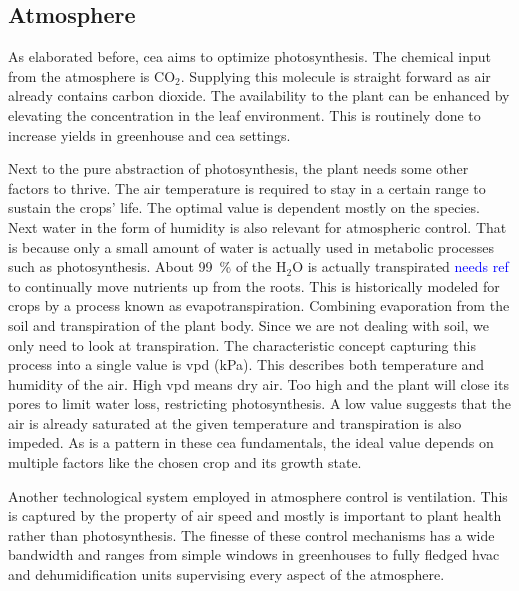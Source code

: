 \subsection{Atmosphere}
As elaborated before, \ac{cea} aims to optimize photosynthesis.
The chemical input from the atmosphere is CO$_2$.
Supplying this molecule is straight forward as air already contains carbon dioxide.
The availability to the plant can be enhanced by elevating the concentration in the leaf environment.
This is routinely done to increase yields in greenhouse and \ac{cea} settings.

Next to the pure abstraction of photosynthesis, the plant needs some other factors to thrive.
The air temperature is required to stay in a certain range to sustain the crops' life.
The optimal value is dependent mostly on the species.
Next water in the form of humidity is also relevant for atmospheric control.
That is because only a small amount of water is actually used in metabolic processes such as photosynthesis.
About \SI{99}{\percent} of the H$_2$O is actually transpirated \textcolor{Blue}{needs ref} to continually move nutrients up from the roots.
This is historically modeled for crops by a process known as evapotranspiration.
Combining evaporation from the soil and transpiration of the plant body.
Since we are not dealing with soil, we only need to look at transpiration.
The characteristic concept capturing this process into a single value is \ac{vpd} (\si{\kPa}).
This describes both temperature and humidity of the air.
High \ac{vpd} means dry air.
Too high and the plant will close its pores to limit water loss, restricting photosynthesis.
A low value suggests that the air is already saturated at the given temperature and transpiration is also impeded.
As is a pattern in these \ac{cea} fundamentals, the ideal value depends on multiple factors like the chosen crop and its growth state.

Another technological system employed in atmosphere control is ventilation.
This is captured by the property of air speed and mostly is important to plant health rather than photosynthesis.
The finesse of these control mechanisms has a wide bandwidth and ranges from simple windows in greenhouses to fully fledged \ac{hvac} and dehumidification units supervising every aspect of the atmosphere.


